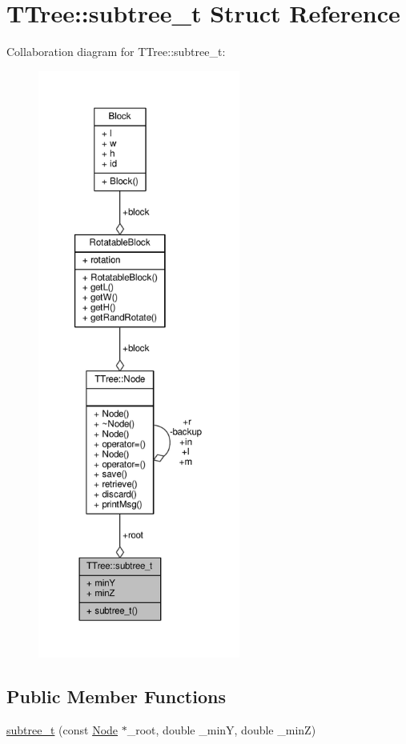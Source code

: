 \hypertarget{structTTree_1_1subtree__t}{}\section{T\+Tree\+:\+:subtree\+\_\+t Struct Reference}
\label{structTTree_1_1subtree__t}


Collaboration diagram for T\+Tree\+:\+:subtree\+\_\+t\+:
\nopagebreak
\begin{figure}[H]
\begin{center}
\leavevmode
\includegraphics[height=550pt]{structTTree_1_1subtree__t__coll__graph}
\end{center}
\end{figure}
\subsection*{Public Member Functions}
\begin{DoxyCompactItemize}
\item 
\hyperlink{structTTree_1_1subtree__t_a39ba129f04bbc5c14f61e4055c575f34}{subtree\+\_\+t} (const \hyperlink{classTTree_1_1Node}{Node} $\ast$\+\_\+root, double \+\_\+min\+Y, double \+\_\+min\+Z)
\end{DoxyCompactItemize}
